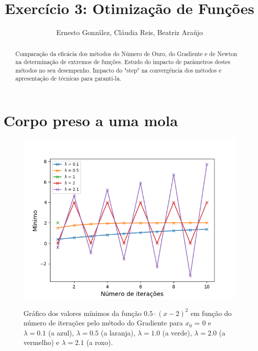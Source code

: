 \documentclass[aps,pre,twocolumn,showpacs,amsmath,amssymb]{revtex4-1}
\begin{document}
\title{Exercício 3: Otimização de Funções}
\author{Ernesto González, Cláudia Reis, Beatriz Araújo}

\begin{abstract}

    Comparação da eficácia dos métodos do Número de Ouro, do Gradiente e de Newton na determinação de extremos de funções. Estudo do impacto de parâmetros destes métodos no seu desempenho. Impacto do "step" na convergência dos métodos e apresentação de técnicas para garanti-la.
\end{abstract}

\maketitle

\section{Corpo preso a uma mola}

\begin{figure}[h]\vspace{-5ex}
   \begin{center}
    \includegraphics[width=\columnwidth]{1c.png} \\
\caption{Gráfico dos valores mínimos da função $0.5\cdot (x-2)^2$ em função do número de iterações pelo método do Gradiente para $x_0$ = 0 e $\lambda = 0.1$ (a azul), $\lambda = 0.5$ (a laranja), $\lambda = 1.0$ (a verde), $\lambda = 2.0$ (a vermelho) e $\lambda = 2.1$ (a roxo).}
   \end{center}
\end{figure}
\end{document}
